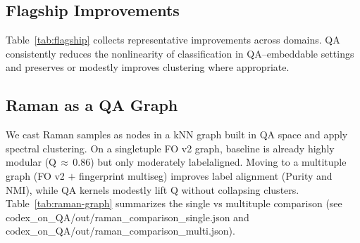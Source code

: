 \subsection{Flagship Improvements}

Table~\ref{tab:flagship} collects representative improvements across domains. QA consistently reduces the nonlinearity of classification in QA–embeddable settings and preserves or modestly improves clustering where appropriate.


\subsection{Raman as a QA Graph}

We cast Raman samples as nodes in a k\-NN graph built in QA space and apply spectral clustering. On a single\-tuple FO v2 graph, baseline is already highly modular (Q\,$\approx$\,0.86) but only moderately label\-aligned. Moving to a multi\-tuple graph (FO v2 $+$ fingerprint multiseg) improves label alignment (Purity and NMI), while QA kernels modestly lift Q without collapsing clusters. Table~\ref{tab:raman-graph} summarizes the single vs multi\-tuple comparison (see codex\_on\_QA/out/raman\_comparison\_single.json and codex\_on\_QA/out/raman\_comparison\_multi.json).


